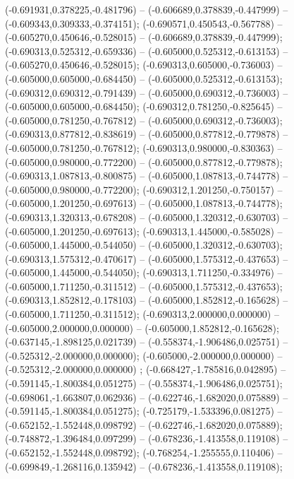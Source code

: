  (-0.691931,0.378225,-0.481796) -- (-0.606689,0.378839,-0.447999) -- (-0.609343,0.309333,-0.374151);
 (-0.690571,0.450543,-0.567788) -- (-0.605270,0.450646,-0.528015) -- (-0.606689,0.378839,-0.447999);
 (-0.690313,0.525312,-0.659336) -- (-0.605000,0.525312,-0.613153) -- (-0.605270,0.450646,-0.528015);
 (-0.690313,0.605000,-0.736003) -- (-0.605000,0.605000,-0.684450) -- (-0.605000,0.525312,-0.613153);
 (-0.690312,0.690312,-0.791439) -- (-0.605000,0.690312,-0.736003) -- (-0.605000,0.605000,-0.684450);
 (-0.690312,0.781250,-0.825645) -- (-0.605000,0.781250,-0.767812) -- (-0.605000,0.690312,-0.736003);
 (-0.690313,0.877812,-0.838619) -- (-0.605000,0.877812,-0.779878) -- (-0.605000,0.781250,-0.767812);
 (-0.690313,0.980000,-0.830363) -- (-0.605000,0.980000,-0.772200) -- (-0.605000,0.877812,-0.779878);
 (-0.690313,1.087813,-0.800875) -- (-0.605000,1.087813,-0.744778) -- (-0.605000,0.980000,-0.772200);
 (-0.690312,1.201250,-0.750157) -- (-0.605000,1.201250,-0.697613) -- (-0.605000,1.087813,-0.744778);
 (-0.690313,1.320313,-0.678208) -- (-0.605000,1.320312,-0.630703) -- (-0.605000,1.201250,-0.697613);
 (-0.690313,1.445000,-0.585028) -- (-0.605000,1.445000,-0.544050) -- (-0.605000,1.320312,-0.630703);
 (-0.690313,1.575312,-0.470617) -- (-0.605000,1.575312,-0.437653) -- (-0.605000,1.445000,-0.544050);
 (-0.690313,1.711250,-0.334976) -- (-0.605000,1.711250,-0.311512) -- (-0.605000,1.575312,-0.437653);
 (-0.690313,1.852812,-0.178103) -- (-0.605000,1.852812,-0.165628) -- (-0.605000,1.711250,-0.311512);
 (-0.690313,2.000000,0.000000) -- (-0.605000,2.000000,0.000000) -- (-0.605000,1.852812,-0.165628);
 (-0.637145,-1.898125,0.021739) -- (-0.558374,-1.906486,0.025751) -- (-0.525312,-2.000000,0.000000);
 (-0.605000,-2.000000,0.000000) -- (-0.525312,-2.000000,0.000000) ;
 (-0.668427,-1.785816,0.042895) -- (-0.591145,-1.800384,0.051275) -- (-0.558374,-1.906486,0.025751);
 (-0.698061,-1.663807,0.062936) -- (-0.622746,-1.682020,0.075889) -- (-0.591145,-1.800384,0.051275);
 (-0.725179,-1.533396,0.081275) -- (-0.652152,-1.552448,0.098792) -- (-0.622746,-1.682020,0.075889);
 (-0.748872,-1.396484,0.097299) -- (-0.678236,-1.413558,0.119108) -- (-0.652152,-1.552448,0.098792);
 (-0.768254,-1.255555,0.110406) -- (-0.699849,-1.268116,0.135942) -- (-0.678236,-1.413558,0.119108);
